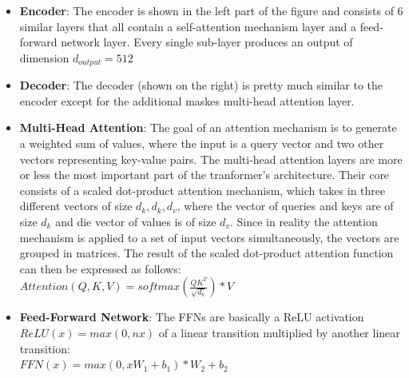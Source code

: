\begin{itemize}
    \item \textbf{Encoder}: The encoder is shown in the left part of the figure and consists of 6 similar layers that all contain a self-attention mechanism layer and a feed-forward network layer. Every single sub-layer produces an output of dimension $d_{output} = 512$
    \item \textbf{Decoder}: The decoder (shown on the right) is pretty much similar to the encoder except for the additional maskes multi-head attention layer.
    \item \textbf{Multi-Head Attention}: The goal of an attention mechanism is to generate a weighted sum of values, where the input is a query vector and two other vectors representing key-value pairs. The multi-head attention layers are more or less the most important part of the tranformer's architecture. Their core consists of a scaled dot-product attention mechanism, which takes in three different vectors of size $d_k, d_k, d_v$, where the vector of queries and keys are of size $d_k$ and die vector of values is of size $d_v$. Since in reality the attention mechanism is applied to a set of input vectors simultaneously, the vectors are grouped in matrices. The result of the scaled dot-product attention function can then be expressed as follows: \\
    $Attention(Q, K, V) = softmax(\frac{QK^T}{\sqrt{d_k}})*V$
    \item \textbf{Feed-Forward Network}: The FFNs are basically a ReLU activation $ReLU(x) = max(0, nx)$ of a linear transition multiplied by another linear transition: \\
    $FFN(x) = max(0, xW_1+b_1)*W_2+b_2$
\end{itemize}